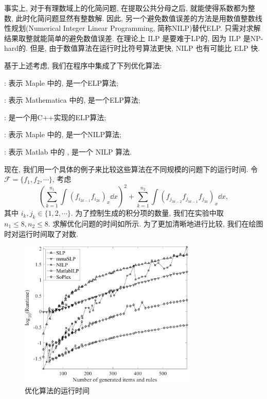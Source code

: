 事实上, 对于有理数域上的化简问题, 在提取公共分母之后, 就能使得系数都为整数, 此时化简问题显然有整数解. 因此, 另一个避免数值误差的方法是用数值整数线性规划(Numerical Integer Linear Programming, 简称NILP)替代ELP. 只需对求解结果取整就能简单的避免数值误差. 在理论上 ILP 是要难于LP的, 因为 ILP 是NP-hard的. 但是, 由于数值算法在运行时比符号算法更快, NILP 也有可能比 ELP 快. 

基于上述考虑, 我们在程序中集成了下列优化算法: 
\begin{compactitem}[\textbullet]
\item {}: 表示 Maple 中的, 是一个ELP算法; 
\item {}: 表示 Mathematica 中的, 是一个ELP算法;
\item {}\cite{soplex}: 是一个用C++实现的ELP算法;
\item {}: 表示 Maple 中的, 是一个NILP算法;
\item {}: 表示 Matlab 中的  , 是一个 NILP 算法.
\end{compactitem}

现在, 我们用一个具体的例子来比较这些算法在不同规模的问题下的运行时间. 令$\mathcal F=\{f_1,f_2,\cdots\}$, 考虑
\begin{equation}
\left(\sum\limits_{k=1}^{n_1}{\int\!{(f_{i_{2k-1}}f_{i_{2k}})_x\dd x}}\right)^2+\sum\limits_{k=1}^{n_2}{\int\!{(f_{j_{3k-2}}f_{j_{3k-1}}f_{j_{3k}})_x\dd x}},
\end{equation}
其中 $i_k,j_k \in \{1,2,\cdots\}$. 为了控制生成的积分项的数量, 我们在实验中取$n_1\le 8,n_2\le 8$. 求解优化问题的时间如所示. 为了更加清晰地进行比较, 我们在绘图时对运行时间取了对数. 

\begin{figure}[htbp]
\centering
\includegraphics[width=0.75\textwidth]{fig/int-6.pdf}
\caption{优化算法的运行时间}\label{opts_log}
\label{opts_all}
\end{figure}

